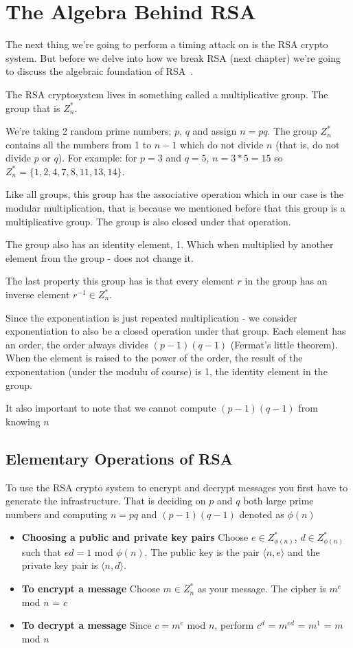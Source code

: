 \section{The Algebra Behind RSA}
The next thing we're going to perform a timing attack on is the RSA crypto system.
But before we delve into how we break RSA (next chapter) we're going to discuss the
algebraic foundation of RSA~\cite{kaliski2006mathematics}.

The RSA cryptosystem lives in something called a multiplicative group.
The group that is $Z^{*}_n$.

We're taking 2 random prime numbers; $p$, $q$ and assign $n=pq$. The group $Z^{*}_n$ 
contains all the numbers from 1 to $n-1$ which do not divide $n$ (that is, do not divide $p$ or $q$).
For example: for $p=3$ and $q=5$, $n= 3*5 = 15$ so $Z^{*}_n = {\{1,2,4,7,8,11,13,14\}}$.

Like all groups, this group has the associative operation which in our case is the modular multiplication,
that is because we mentioned before that this group is a multiplicative group.
The group is also closed under that operation.

The group also has an identity element, 1. Which when multiplied by another element from the group - does not change it.

The last property this group has is that every element $r$ in the group
has an inverse element $r^{-1} \in Z^{*}_n$.

Since the exponentiation is just repeated multiplication - we consider exponentiation 
to also be a closed operation under that group. Each element has an order, the order always divides $(p-1)(q-1)$ (Fermat's little theorem).
When the element is raised to the power of the order, the result of the exponentation (under the modulu of course) is 1, the identity element in the group.

It also important to note that we cannot compute $(p-1)(q-1)$ from knowing $n$

\subsection{Elementary Operations of RSA}
To use the RSA crypto system to encrypt and decrypt messages you first have to generate the infrastructure.
That is deciding on $p$ and $q$ both large prime numbers and computing $n = pq$ and $(p-1)(q-1)$ denoted as $\phi(n)$

\begin{itemize}
    \item \textbf{Choosing a public and private key pairs}
    Choose $e \in Z^{*}_{\phi(n)}$, $d \in Z^{*}_{\phi(n)}$ such that $ed = 1$ mod $\phi(n)$.
    The public key is the pair $\langle{n,e}\rangle$  and the private key pair is  $\langle{n,d}\rangle$.
    \item \textbf{To encrypt a message}
    Choose $m \in Z^{*}_n$ as your message.
    The cipher is $m^{e}$ mod $n$ = $c$
    \item \textbf{To decrypt a message}
    Since $c = m^{e}$ mod $n$, perform $c^{d}$ = $m^{ed}$ = $m^{1}$ = $m$ mod $n$
\end{itemize}

